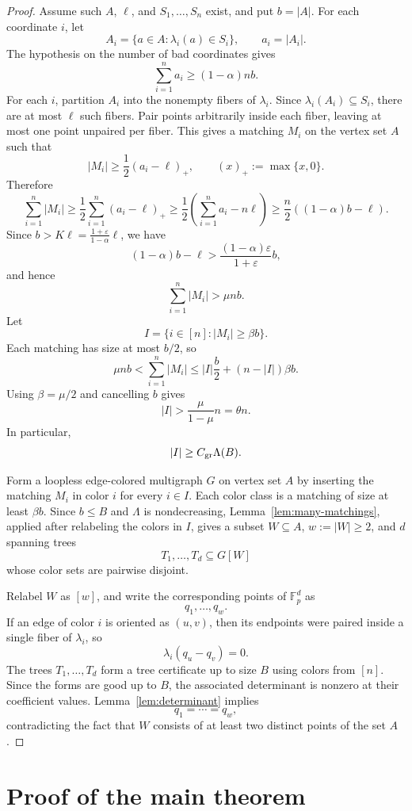\documentclass{amsart}
\theoremstyle{definition}
\theoremstyle{remark}
\newcommand{\Fp}{\mathbb{F}_p}
\begin{document}
\begin{proof}
Assume such $A$, $\ell$, and $S_1,\ldots,S_n$ exist, and put $b=|A|$. For each coordinate $i$, let
\[
A_i=\{a\in A:\lambda_i(a)\in S_i\},
\qquad
 a_i=|A_i|.
\]
The hypothesis on the number of bad coordinates gives
\[
\sum_{i=1}^n a_i\ge (1-\alpha)nb.
\]
For each $i$, partition $A_i$ into the nonempty fibers of $\lambda_i$. Since $\lambda_i(A_i)\subseteq S_i$, there are at most $\ell$ such fibers. Pair points arbitrarily inside each fiber, leaving at most one point unpaired per fiber. This gives a matching $M_i$ on the vertex set $A$ such that
\[
|M_i|\ge \frac12(a_i-\ell)_+,
\qquad (x)_+:=\max\{x,0\}.
\]
Therefore
\[
\sum_{i=1}^n |M_i|
\ge \frac12\sum_{i=1}^n(a_i-\ell)_+
\ge \frac12\left(\sum_{i=1}^n a_i-n\ell\right)
\ge \frac n2((1-\alpha)b-\ell).
\]
Since $b>K\ell=\frac{1+\varepsilon}{1-\alpha}\ell$, we have
\[
(1-\alpha)b-\ell
>
\frac{(1-\alpha)\varepsilon}{1+\varepsilon}b,
\]
and hence
\[
\sum_{i=1}^n |M_i|>\mu nb.
\]
Let
\[
I=\{i\in[n]: |M_i|\ge \beta b\}.
\]
Each matching has size at most $b/2$, so
\[
\mu nb
<\sum_{i=1}^n |M_i|
\le |I|\frac b2+(n-|I|)\beta b.
\]
Using $\beta=\mu/2$ and cancelling $b$ gives
\[
|I|>\frac{\mu}{1-\mu}n=\theta n.
\]
In particular,
\[
|I|\ge C_{\rm gr}\Lambda(B).
\]

Form a loopless edge-colored multigraph $G$ on vertex set $A$ by inserting the matching $M_i$ in color $i$ for every $i\in I$. Each color class is a matching of size at least $\beta b$. Since $b\le B$ and $\Lambda$ is nondecreasing, Lemma~\ref{lem:many-matchings}, applied after relabeling the colors in $I$, gives a subset $W\subseteq A$, $w:=|W|\ge2$, and $d$ spanning trees
\[
T_1,\ldots,T_d\subseteq G[W]
\]
whose color sets are pairwise disjoint.

Relabel $W$ as $[w]$, and write the corresponding points of $\Fp^d$ as
\[
q_1,\ldots,q_w.
\]
If an edge of color $i$ is oriented as $(u,v)$, then its endpoints were paired inside a single fiber of $\lambda_i$, so
\[
\lambda_i(q_u-q_v)=0.
\]
The trees $T_1,\ldots,T_d$ form a tree certificate up to size $B$ using colors from $[n]$. Since the forms are good up to $B$, the associated determinant is nonzero at their coefficient values. Lemma~\ref{lem:determinant} implies
\[
q_1=\cdots=q_w,
\]
contradicting the fact that $W$ consists of at least two distinct points of the set $A$.
\end{proof}

\section{Proof of the main theorem}
\end{document}

